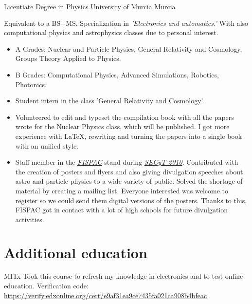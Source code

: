 \documentclass[11pt,a4paper,roman]{moderncv}
\begin{document}
	{Licentiate Degree in Physics}
	{University of Murcia}
	{Murcia}
	{}
	{Equivalent to a BS+MS. Specialization in \textit{'Electronics and automatics.'}
	 With also computational physics and astrophysics classes due to personal interest.
	\begin{itemize}
		\item A Grades: Nuclear and Particle Physics, General Relativity and 
		Cosmology, Groups Theory Applied to Physics.
		\item B Grades:	Computational Physics, Advanced Simulations, Robotics, 
		Photonics.
		\item Student intern in the class 'General Relativity and Cosmology'.
		\item Volunteered to edit and typeset the compilation book with all the 
		papers wrote for the Nuclear Physics class, which will be published. I got 
		more experience with \LaTeX, rewriting and turning the 
		papers into a single book with an unified style.
		\item Staff member in the \textit{\href{http://www.um.es/fispac/}
		{FISPAC}} stand during \textit{\href{http://www.f-
		seneca.org/secyt10/home.php}{SECyT 2010}}. Contributed with the creation of 
		posters and flyers and also giving divulgation speeches about astro and 
		particle physics to a wide variety of public. Solved the shortage of material 
		by creating a mailing list. Everyone interested was welcome to register so we 
		could send them digital versions of the posters. Thanks to this, FISPAC got 
		in contact with a lot of high schools for future divulgation activities.
	\end{itemize}	
	}


\section{Additional education}


	{MITx}
	{}
	{}
	{Took this course to refresh my knowledge in electronics and to test online 
	education. 
	Verification code: \newline{} \url{https://verify.edxonline.org/cert/e9af31ea9ce7435fa021ca908b4bfeac}}
\end{document}
